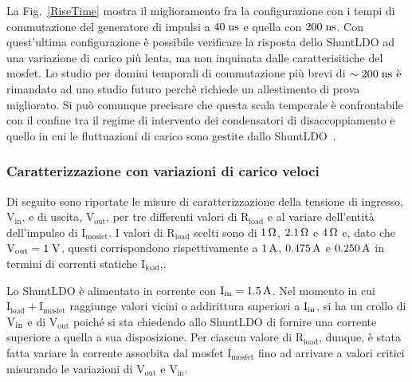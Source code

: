 La Fig.~\ref{RiseTime} mostra il miglioramento fra la configurazione con i tempi di commutazione del generatore di impulsi a $40 \rm \; ns$ e quella con $200 \rm \; ns$. Con quest'ultima configurazione è possibile verificare la risposta dello ShuntLDO ad una variazione di carico più lenta, ma non inquinata dalle caratterisitiche del mosfet. Lo studio per domini temporali di commutazione pi\`u brevi di $\sim 200\rm \; ns$ \`e rimandato ad uno studio futuro perch\`e richiede un allestimento di prova migliorato. Si pu\`o comunque precisare che questa scala temporale \`e confrontabile con il confine tra il regime di intervento dei condensatori di disaccoppiamento e quello in cui le fluttuazioni di carico sono gestite dallo ShuntLDO~\cite{saramarconi}.
 

\subsubsection{Caratterizzazione con variazioni di carico veloci}

Di seguito sono riportate le misure di caratterizzazione della tensione di ingresso, $\mathrm{V_{in}}$, e di uscita, $\mathrm{V_{out}}$, per tre differenti valori di $\mathrm{R_{load}}$ e al variare dell'entit\`a dell'impulso di $\mathrm{I_{mosfet}}$.
I valori di $\mathrm{R_{load}}$ scelti sono di $1{\rm \, \Omega}$, $2.1{\rm \, \Omega}$ e $4{\rm \, \Omega}$ e, dato che $\mathrm{V_{out}=1\rm \; V}$, questi corrispondono rispettivamente a $1\rm \, A$, $0.475\rm \, A$ e $0.250\rm \, A$ in termini di correnti statiche $\mathrm{I_{load}}$,.

Lo ShuntLDO è alimentato in corrente con $\mathrm{I_{in}} = 1.5\rm \, A$. Nel momento in cui $\mathrm{I_{load}+I_{mosfet}}$ raggiunge valori vicini o addirittura superiori  a $\mathrm{I_{in}}$, si ha un crollo di $\mathrm{V_{in}}$ e di $\mathrm{V_{out}}$ poiché si sta chiedendo allo ShuntLDO di fornire una corrente superiore a quella a sua disposizione.
Per ciascun valore di $\mathrm{R_{load}}$, dunque, è stata fatta variare la corrente assorbita dal mosfet $\mathrm{I_{mosfet}}$ fino ad arrivare a valori critici misurando le variazioni di $\mathrm{V_{out}}$ e $\mathrm{V_{in}}$. 

